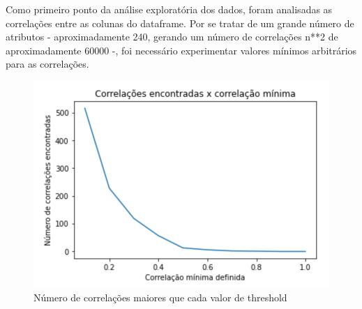             Como primeiro ponto da análise exploratória dos dados, foram analisadas as correlações entre as colunas do dataframe. Por se tratar de um grande número de atributos - aproximadamente 240, gerando um número de correlações n**2 de aproximadamente 60000 -, foi necessário experimentar valores mínimos arbitrários para as correlações.

            \begin{figure}[htb]
            	\caption{\label{corrs_graph}Número de correlações maiores que cada valor de threshold}
            	\begin{center}
            		\includegraphics[scale=0.8]{corrs_graph.png}
            	\end{center}
            \end{figure}

